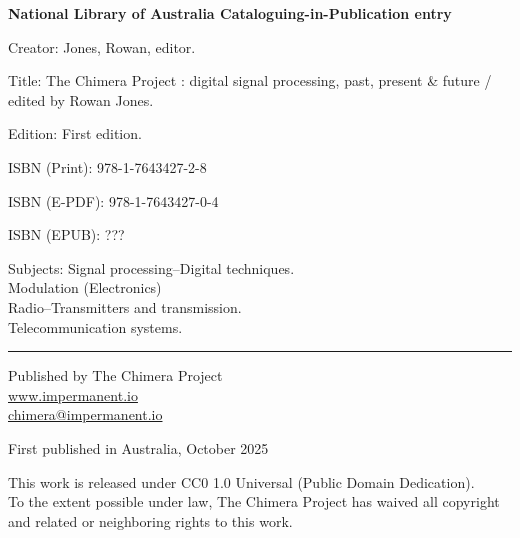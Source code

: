 \newpage
\thispagestyle{empty}

\vspace*{5cm}

\begin{flushleft}

{\small
\textbf{National Library of Australia Cataloguing-in-Publication entry}

\vspace{0.5cm}

Creator: Jones, Rowan, editor.

\vspace{0.3cm}

Title: The Chimera Project : digital signal processing, past, present \& future / edited by Rowan Jones.

\vspace{0.3cm}

Edition: First edition.

\vspace{0.3cm}

\item ISBN (Print): 978-1-7643427-2-8
\item ISBN (E-PDF): 978-1-7643427-0-4
\item ISBN (EPUB): ???

\vspace{0.3cm}

Subjects: Signal processing--Digital techniques.\\
\hspace*{2em}Modulation (Electronics)\\
\hspace*{2em}Radio--Transmitters and transmission.\\
\hspace*{2em}Telecommunication systems.

\vspace{1cm}

\rule{0.3\textwidth}{0.4pt}

\vspace{0.5cm}

Published by The Chimera Project\\
\url{www.impermanent.io}\\
\href{mailto:chimera@impermanent.io}{chimera@impermanent.io}

\vspace{0.5cm}

First published in Australia, October 2025

\vspace{0.5cm}

This work is released under CC0 1.0 Universal (Public Domain Dedication).\\
To the extent possible under law, The Chimera Project has waived all copyright\\
and related or neighboring rights to this work.

}

\end{flushleft}

\newpage
